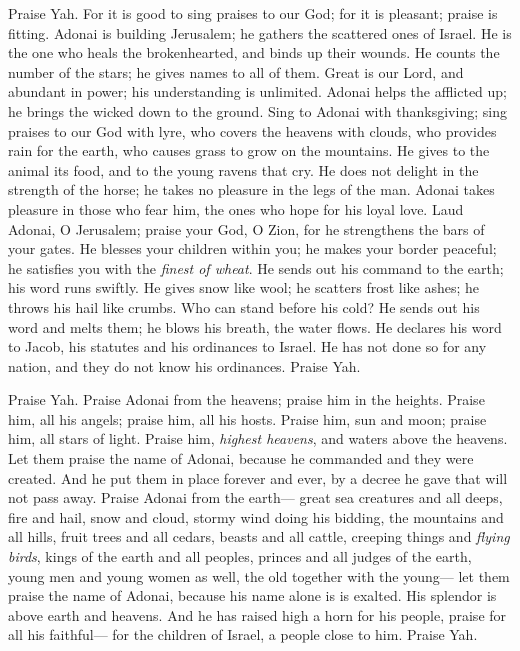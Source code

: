 \begin{biblechapter} %
 Praise Yah. 
For it is good to sing praises to our God; 
for it is pleasant; praise is fitting.
\verse Adonai is building Jerusalem; 
he gathers the scattered ones of Israel.
\verse He is the one who heals the brokenhearted, 
and binds up their wounds.
\verse He counts the number of the stars; 
he gives names to all of them.
\verse Great is our Lord, and abundant in power; 
his understanding is unlimited.
\verse Adonai helps the afflicted up; 
he brings the wicked down to the ground.
\verse Sing to Adonai with thanksgiving; 
sing praises to our God with lyre,
\verse who covers the heavens with clouds, 
who provides rain for the earth, 
who causes grass to grow on the mountains.
\verse He gives to the animal its food, 
and to the young ravens that cry.
\verse He does not delight in the strength of the horse; 
he takes no pleasure in the legs of the man.
\verse Adonai takes pleasure in those who fear him, 
the ones who hope for his loyal love.
\verse Laud Adonai, O Jerusalem; 
praise your God, O Zion,
\verse for he strengthens the bars of your gates. 
He blesses your children within you;
\verse he makes your border peaceful; 
he satisfies you with the \textit{finest of wheat}.
\verse He sends out his command to the earth; 
his word runs swiftly.
\verse He gives snow like wool; 
he scatters frost like ashes;
\verse he throws his hail like crumbs. 
Who can stand before his cold?
\verse He sends out his word and melts them; 
he blows his breath, the water flows.
\verse He declares his word to Jacob, 
his statutes and his ordinances to Israel.
\verse He has not done so for any nation, 
and they do not know his ordinances. 
Praise Yah.
\end{biblechapter}

\begin{biblechapter} %
 Praise Yah. 
Praise Adonai from the heavens; 
praise him in the heights.
\verse Praise him, all his angels; 
praise him, all his hosts.
\verse Praise him, sun and moon; 
praise him, all stars of light.
\verse Praise him, \textit{highest heavens}, 
and waters above the heavens.
\verse Let them praise the name of Adonai, 
because he commanded and they were created.
\verse And he put them in place forever and ever, 
by a decree he gave that will not pass away.
\verse Praise Adonai from the earth— 
great sea creatures and all deeps,
\verse fire and hail, snow and cloud, 
stormy wind doing his bidding,
\verse the mountains and all hills, 
fruit trees and all cedars,
\verse beasts and all cattle, 
creeping things and \textit{flying birds},
\verse kings of the earth and all peoples, 
princes and all judges of the earth,
\verse young men and young women as well, 
the old together with the young—
\verse let them praise the name of Adonai, 
because his name alone is is exalted. 
His splendor is above earth and heavens.
\verse And he has raised high a horn for his people, 
praise for all his faithful— 
for the children of Israel, 
a people close to him. 
Praise Yah.
\end{biblechapter}

